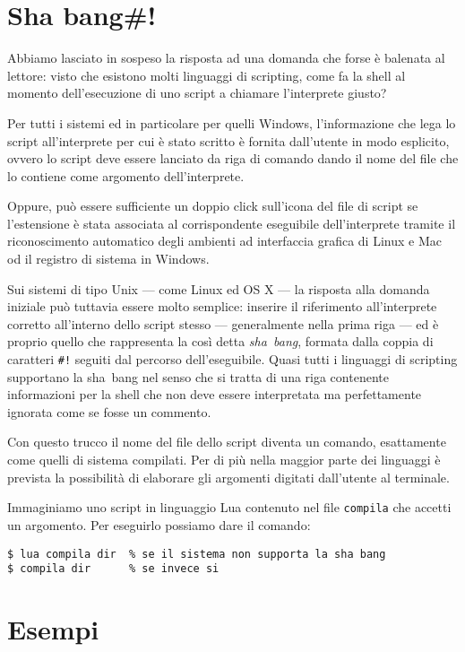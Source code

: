 \section{Sha bang\#!}

Abbiamo lasciato in sospeso la risposta ad una domanda che forse è balenata al
lettore: visto che esistono molti linguaggi di scripting, come fa la shell al
momento dell'esecuzione di uno script a chiamare l'interprete giusto?

Per tutti i sistemi ed in particolare per quelli Windows, l'informazione che
lega lo script all'interprete per cui è stato scritto è fornita dall'utente in
modo esplicito, ovvero lo script deve essere lanciato da riga di comando dando
il nome del file che lo contiene come argomento dell'interprete.

Oppure, può essere sufficiente un doppio click sull'icona del file di script
se l'estensione è stata associata al corrispondente eseguibile dell'interprete
tramite il riconoscimento automatico degli ambienti ad interfaccia grafica di
Linux e Mac od il registro di sistema in Windows.

Sui sistemi di tipo Unix --- come Linux ed OS X --- la risposta alla domanda
iniziale può tuttavia essere molto semplice: inserire il riferimento
all'interprete corretto all'interno dello script stesso --- generalmente nella
prima riga --- ed è proprio quello che rappresenta la così detta
\emph{sha~bang}, formata dalla coppia di caratteri \texttt{\#!} seguiti dal
percorso dell'eseguibile. Quasi tutti i linguaggi di scripting supportano la
sha~bang nel senso che si tratta di una riga contenente informazioni per la
shell che non deve essere interpretata ma perfettamente ignorata come se fosse
un commento.

Con questo trucco il nome del file dello script diventa un comando,
esattamente come quelli di sistema compilati. Per di più nella maggior parte
dei linguaggi è prevista la possibilità di elaborare gli argomenti digitati
dall'utente al terminale.

Immaginiamo uno script in linguaggio Lua contenuto nel file \texttt{compila}
che accetti un argomento. Per eseguirlo possiamo dare il comando:
\begin{Verbatim}
$ lua compila dir  % se il sistema non supporta la sha bang  
$ compila dir      % se invece si
\end{Verbatim}

\section{Esempi}

